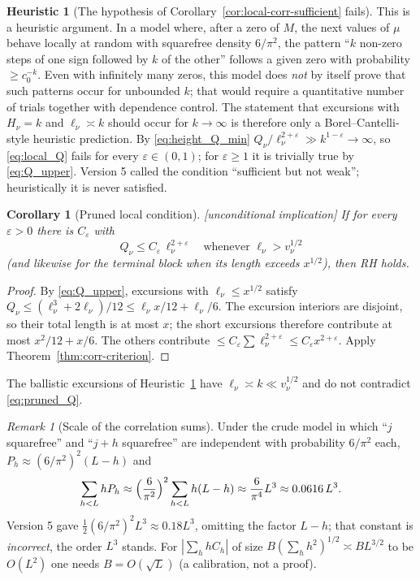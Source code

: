 \documentclass[11pt]{amsart}
\numberwithin{equation}{section}
\theoremstyle{plain}
\newtheorem{corollary}[theorem]{Corollary}
\theoremstyle{definition}
\newtheorem{heuristic}[theorem]{Heuristic}
\theoremstyle{remark}
\newtheorem{remark}[theorem]{Remark}
\newcommand{\eps}{\varepsilon}
\begin{document}
\begin{heuristic}[The hypothesis of Corollary~\ref{cor:local-corr-sufficient} fails]
\label{heu:local_fails}
This is a heuristic argument. In a model where, after a zero of $M$, the next
values of $\mu$ behave locally at random with squarefree density $6/\pi^2$,
the pattern ``$k$ non-zero steps of one sign followed by $k$ of the other''
follows a given zero with probability $\ge c_0^{-k}$. Even with infinitely many zeros, this model does \emph{not} by itself
prove that such patterns occur for unbounded $k$; that would require a
quantitative number of trials together with dependence control. The
statement that excursions with $H_\nu=k$ and $\ell_\nu\asymp k$ should
occur for $k\to\infty$ is therefore only a Borel--Cantelli-style
heuristic prediction. By \eqref{eq:height_Q_min}
$Q_\nu/\ell_\nu^{2+\eps}\gg k^{1-\eps}\to\infty$, so \eqref{eq:local_Q}
fails for every $\eps\in(0,1)$; for $\eps\ge1$ it is trivially true by
\eqref{eq:Q_upper}. Version 5 called the condition ``sufficient but not
weak''; heuristically it is never satisfied.
\end{heuristic}

\begin{corollary}[Pruned local condition]
\label{cor:pruned_local}
\emph{[unconditional implication]} If for every $\eps>0$ there is $C_\eps$
with
\begin{equation}
\label{eq:pruned_Q}
  Q_\nu\le C_\eps\,\ell_\nu^{2+\eps}\quad\text{whenever }\ell_\nu>v_\nu^{1/2}
\end{equation}
(and likewise for the terminal block when its length exceeds $x^{1/2}$),
then RH holds.
\end{corollary}

\begin{proof}
By \eqref{eq:Q_upper}, excursions with $\ell_\nu\le x^{1/2}$ satisfy
$Q_\nu\le(\ell_\nu^3+2\ell_\nu)/12\le\ell_\nu x/12+\ell_\nu/6$.
The excursion interiors are disjoint, so their total length is at most $x$;
the short excursions therefore contribute at most $x^2/12+x/6$. The others
contribute $\le C_\eps\sum\ell_\nu^{2+\eps}\le C_\eps x^{2+\eps}$.
Apply Theorem~\ref{thm:corr-criterion}.
\end{proof}

\noindent The ballistic excursions of Heuristic~\ref{heu:local_fails} have
$\ell_\nu\asymp k\ll v_\nu^{1/2}$ and do not contradict \eqref{eq:pruned_Q}.

\begin{remark}[Scale of the correlation sums]
\label{rem:chowla-scale}
Under the crude model in which ``$j$ squarefree'' and ``$j+h$ squarefree''
are independent with probability $6/\pi^2$ each,
$P_h\approx(6/\pi^2)^2(L-h)$ and
\begin{equation}
\label{eq:chowla_crude}
  \sum_{h<L}hP_h\approx\Bigl(\frac{6}{\pi^2}\Bigr)^2\sum_{h<L}h(L-h)
  \approx\frac{6}{\pi^4}L^3\approx0.0616\,L^3 .
\end{equation}
Version 5 gave $\tfrac12(6/\pi^2)^2L^3\approx0.18L^3$, omitting the factor
$L-h$; that constant is \emph{incorrect}, the order $L^3$ stands. For
$|\sum_hhC_h|$ of size $B(\sum_hh^2)^{1/2}\asymp BL^{3/2}$ to be $O(L^2)$ one
needs $B=O(\sqrt L)$ (a calibration, not a proof).
\end{remark}
\end{document}

